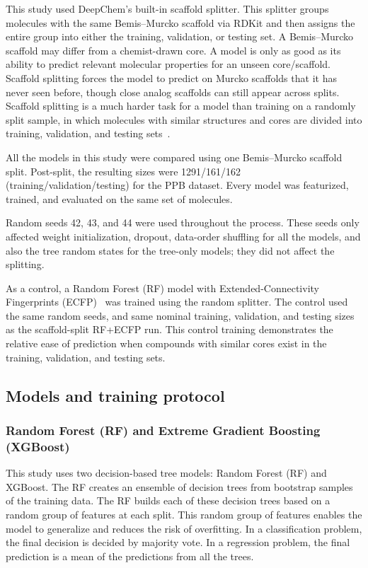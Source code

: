 \documentclass[11pt,a4paper]{article}
\begin{document}
This study used DeepChem's built-in scaffold splitter.
This splitter groups molecules with the same Bemis--Murcko scaffold via RDKit and then assigns the entire group into either the training, validation, or testing set.
A Bemis--Murcko scaffold may differ from a chemist-drawn core.
A model is only as good as its ability to predict relevant molecular properties for an unseen core/scaffold.
Scaffold splitting forces the model to predict on Murcko scaffolds that it has never seen before, though close analog scaffolds can still appear across splits.
Scaffold splitting is a much harder task for a model than training on a randomly split sample, in which molecules with similar structures and cores are divided into training, validation, and testing sets~\cite{wu2018moleculenet,sheridan2013time}.

All the models in this study were compared using one Bemis--Murcko scaffold split.
Post-split, the resulting sizes were 1291/161/162 (training/validation/testing) for the PPB dataset.
Every model was featurized, trained, and evaluated on the same set of molecules.

Random seeds 42, 43, and 44 were used throughout the process.
These seeds only affected weight initialization, dropout, data-order shuffling for all the models, and also the tree random states for the tree-only models; they did not affect the splitting.

As a control, a Random Forest (RF) model with Extended-Connectivity Fingerprints (ECFP)~\cite{rogers2010ecfp} was trained using the random splitter.
The control used the same random seeds, and same nominal training, validation, and testing sizes as the scaffold-split RF+ECFP run.
This control training demonstrates the relative ease of prediction when compounds with similar cores exist in the training, validation, and testing sets.

\subsection{Models and training protocol}

\subsubsection{Random Forest (RF) and Extreme Gradient Boosting (XGBoost)}
This study uses two decision-based tree models: Random Forest (RF) and XGBoost.
The RF creates an ensemble of decision trees from bootstrap samples of the training data.
The RF builds each of these decision trees based on a random group of features at each split.
This random group of features enables the model to generalize and reduces the risk of overfitting.
In a classification problem, the final decision is decided by majority vote.
In a regression problem, the final prediction is a mean of the predictions from all the trees.
\end{document}
